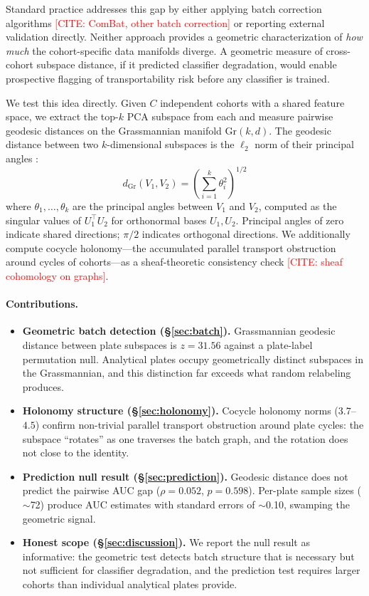 \documentclass{article}
\begin{document}
Standard practice addresses this gap by either applying batch correction algorithms \textcolor{red}{[CITE: ComBat, other batch correction]} or reporting external validation directly. Neither approach provides a geometric characterization of \emph{how much} the cohort-specific data manifolds diverge. A geometric measure of cross-cohort subspace distance, if it predicted classifier degradation, would enable prospective flagging of transportability risk before any classifier is trained.

We test this idea directly. Given $C$ independent cohorts with a shared feature space, we extract the top-$k$ PCA subspace from each and measure pairwise geodesic distances on the Grassmannian manifold $\mathrm{Gr}(k, d)$. The geodesic distance between two $k$-dimensional subspaces is the $\ell_2$ norm of their principal angles \citep{golub1973numerical, ye2016schubert}:
\begin{equation}
d_{\mathrm{Gr}}(V_1, V_2) = \left(\sum_{i=1}^{k} \theta_i^2\right)^{1/2}
\end{equation}
where $\theta_1, \ldots, \theta_k$ are the principal angles between $V_1$ and $V_2$, computed as the singular values of $U_1^\top U_2$ for orthonormal bases $U_1, U_2$. Principal angles of zero indicate shared directions; $\pi/2$ indicates orthogonal directions. We additionally compute cocycle holonomy---the accumulated parallel transport obstruction around cycles of cohorts---as a sheaf-theoretic consistency check \textcolor{red}{[CITE: sheaf cohomology on graphs]}.

\paragraph{Contributions.}
\begin{itemize}
\item \textbf{Geometric batch detection (\S\ref{sec:batch}).} Grassmannian geodesic distance between plate subspaces is $z = 31.56$ against a plate-label permutation null. Analytical plates occupy geometrically distinct subspaces in the Grassmannian, and this distinction far exceeds what random relabeling produces.
\item \textbf{Holonomy structure (\S\ref{sec:holonomy}).} Cocycle holonomy norms ($3.7$--$4.5$) confirm non-trivial parallel transport obstruction around plate cycles: the subspace ``rotates'' as one traverses the batch graph, and the rotation does not close to the identity.
\item \textbf{Prediction null result (\S\ref{sec:prediction}).} Geodesic distance does not predict the pairwise AUC gap ($\rho = 0.052$, $p = 0.598$). Per-plate sample sizes ($\sim$72) produce AUC estimates with standard errors of $\sim$0.10, swamping the geometric signal.
\item \textbf{Honest scope (\S\ref{sec:discussion}).} We report the null result as informative: the geometric test detects batch structure that is necessary but not sufficient for classifier degradation, and the prediction test requires larger cohorts than individual analytical plates provide.
\end{itemize}
\end{document}
